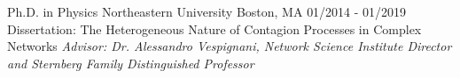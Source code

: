 \vspace{-3mm}
\begin{cventries}

  \cveducationentry
    {Ph.D. in Physics} %
    {Northeastern University} %
    {Boston, MA} %
    {01/2014 - 01/2019} %
    {Dissertation: The Heterogeneous Nature of Contagion Processes in  Complex Networks
    \newline \textit{Advisor: Dr. Alessandro Vespignani, Network Science Institute Director and Sternberg Family Distinguished Professor}}
    

\end{cventries}
